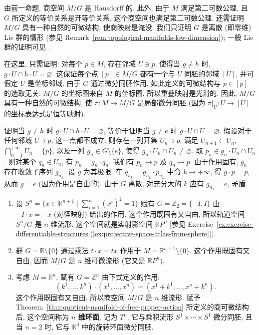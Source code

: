 \begin{RiemannProof}
由前一命题, 商空间 $M/G$ 是 Hausdorff 的. 此外, 由于 $M$ 满足第二可数公理, 且 $G$ 所定义的等价关系是开等价关系, 这个商空间也满足第二可数公理. 还需证明 $M/G$ 具有一种自然的可微结构, 使商映射是淹没. 我们只证明 $G$ 是离散 (即零维) Lie 群的情形 (参见 Remark~\ref{rem:topological-manifolds-low-dimension}); 一般 Lie 群的证明可见 .

在这里, 只需证明: 对每个 $p\in M$, 存在邻域 $U\ni p$, 使得当 $g\ne h$ 时, $g\cdot U\cap h\cdot U=\varnothing$. 这保证每个点 $[p]\in M/G$ 都有一个与 $U$ 同胚的邻域 $[U]$, 并可假定 $U$ 是坐标邻域. 由于 $G$ 通过微分同胚作用, 如此定义的可微结构与 $p\in[p]$ 的选取无关. $M/G$ 的坐标图来自 $M$ 的坐标图, 所以重叠映射是光滑的. 因此, $M/G$ 具有一种自然的可微结构, 使 $\pi:M\to M/G$ 是局部微分同胚 (因为 $\pi|_U:U\to[U]$ 的坐标表达式是恒等映射).

证明当 $g\ne h$ 时 $g\cdot U\cap h\cdot U=\varnothing$, 等价于证明当 $g\ne e$ 时 $g\cdot U\cap U=\varnothing$. 假设对于任何邻域 $U\ni p$, 这一点都不成立. 则存在一列开集 $U_n\ni p$, 满足 $U_{n+1}\subset U_n$, $\bigcap_{n=1}^{+\infty}U_n=\{p\}$, 以及一列 $g_n\in G\setminus\{e\}$, 使得 $g_n\cdot U_n\cap U_n\ne\varnothing$. 取 $p_n\in g_n\cdot U_n\cap U_n$. 则对某个 $q_n\in U_n$, 有 $p_n=g_n\cdot q_n$. 我们有 $p_n\to p$ 及 $q_n\to p$. 由于作用固有, $g_n$ 存在收敛子序列 $g_{n_k}$. 设 $g$ 为其极限. 在 $q_{n_k}=g_{n_k}\cdot p_{n_k}$ 中令 $k\to+\infty$, 得 $g\cdot p=p$, 从而 $g=e$ (因为作用是自由的). 由于 $G$ 离散, 对充分大的 $k$ 应有 $g_{n_k}=e$, 矛盾.
\end{RiemannProof}

\begin{RiemannExample}\label{ex:projective-spaces-and-tori-as-quotients}
\begin{enumerate}[label=(\arabic*),ref=\arabic*,leftmargin=*]
\item\label{ex:projective-space-antipodal-quotient} 设 $S^n=\{x\in\mathbb{R}^{n+1}\mid\sum_{i=1}^{n}(x^i)^2=1\}$ 赋有 $G=\mathbb{Z}_2=\{-I,I\}$ 由 $-I\cdot x=-x$ (对径映射) 给出的作用. 这个作用既固有又自由, 所以轨道空间 $S^n/G$ 是 $n$ 维流形. 这个空间就是实射影空间 $\mathbb{R}P^n$ [参见 Exercise~\ref{ex:exercise-differentiable-structures}(\ref{ex:projective-space-atlas-from-sphere})].
\item 群 $G=\mathbb{R}\setminus\{0\}$ 通过乘法 $t\cdot x=tx$ 作用于 $M=\mathbb{R}^{n+1}\setminus\{0\}$. 这个作用既固有又自由, 因而 $M/G$ 是 $n$ 维可微流形 (它又是 $\mathbb{R}P^n$).
\item 考虑 $M=\mathbb{R}^n$, 赋有 $G=\mathbb{Z}^n$ 由下式定义的作用:
\[
  (k^1,\ldots,k^n)\cdot(x^1,\ldots,x^n)
  =(x^1+k^1,\ldots,x^n+k^n).
\]
这个作用既固有又自由, 所以商空间 $M/G$ 是 $n$ 维流形. 赋予 Theorem~\ref{thm:quotient-manifold-of-free-proper-action} 所定义的商可微结构后, 这个空间称为 \textbf{$n$ 维环面}, 记为 $T^n$. 它与乘积流形 $S^1\times\cdots\times S^1$ 微分同胚, 且当 $n=2$ 时, 它与 $\mathbb{R}^3$ 中的旋转环面微分同胚.
\end{enumerate}
\end{RiemannExample}

